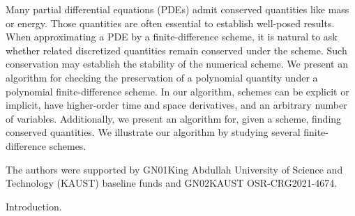 \documentclass{article}
\begin{document}
Many partial differential equations (PDEs) admit conserved quantities like mass or energy. Those quantities are often essential to establish well-posed results. When approximating a PDE by a finite-difference scheme, it is natural to ask whether related discretized quantities remain conserved under the scheme. Such conservation may establish the stability of the numerical scheme. We present an algorithm for checking the preservation of a polynomial quantity under a polynomial finite-difference scheme. In our algorithm, schemes can be explicit or implicit, have higher-order time and space derivatives, and an arbitrary number of variables. 
Additionally, we present an algorithm for, given a scheme, finding conserved quantities. 
We illustrate our algorithm by studying several finite-difference schemes.






	The authors were supported by {GN01}{King Abdullah University of Science and Technology (KAUST) baseline funds}{} and 
	{GN02}{KAUST OSR-CRG2021-4674}{}.


Introduction.
\end{document}
